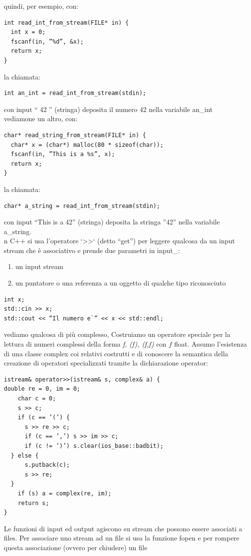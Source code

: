 \documentclass[a4paper,12pt, oneside]{book}
\begin{document}
quindi, per esempio, con:
\begin{verbatim}
int read_int_from_stream(FILE* in) {
  int x = 0;
  fscanf(in, ”%d”, &x);
  return x;
}
\end{verbatim}
la chiamata:
\begin{verbatim}
int an_int = read_int_from_stream(stdin);
\end{verbatim}
con input “ 42 ” (stringa) deposita il numero 42 nella variabile
an\_int\\
vediamone un altro, con:
\begin{verbatim}
char* read_string_from_stream(FILE* in) {
  char* x = (char*) malloc(80 * sizeof(char));
  fscanf(in, ”This is a %s”, x);
  return x;
}
\end{verbatim}
la chiamata:
\begin{verbatim}
char* a_string = read_int_from_stream(stdin);
\end{verbatim}
con input “This is a 42” (stringa) deposita la stringa ”42”
nella variabile a\_string.\\
n C++ si usa l’operatore ‘>>‘ (detto “get”) per leggere qualcosa da un input stream che è associativo e prende due parametri in input\_:
\begin{enumerate}
\item un input stream
\item un puntatore o una referenza a un oggetto di qualche tipo riconosciuto
\end{enumerate}
\begin{verbatim}
int x;
std::cin >> x;
std::cout << ”Il numero e`” << x << std::endl;
\end{verbatim}
vediamo qualcosa di più complesso, Costruiamo un operatore speciale per la lettura di numeri
complessi della forma \textit{f, (f), (f,f)} con $f$ float. Assumo l'esistenza di una classe complex coi relativi costrutti e di conoscere la semantica della creazione di operatori specializzati
tramite la dichiarazione operator:
\begin{verbatim}
istream& operator>>(istream& s, complex& a) {
double re = 0, im = 0;
    char c = 0;
    s >> c;
    if (c == ’(’) {
      s >> re >> c;
      if (c == ’,’) s >> im >> c;
      if (c != ’)’) s.clear(ios_base::badbit);
  } else {
      s.putback(c);
      s >> re;
  }
    if (s) a = complex(re, im);
    return s;
}
\end{verbatim}
Le funzioni di input ed output agiscono su stream che possono
essere associati a files. Per associare uno stream ad un file si usa la funzione fopen e per rompere questa associazione (ovvero per chiudere) un file
\end{document}
